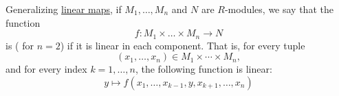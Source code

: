 \begin{definition}\label{def:multilinear_function}\mimprovised
  Generalizing \hyperref[def:semimodule/homomorphism]{linear maps}, if \( M_1, \ldots, M_n \) and \( N \) are \( R \)-modules, we say that the function
  \begin{equation*}
    f: M_1 \times \ldots \times M_n \to N
  \end{equation*}
  is  ( for \( n = 2 \)) if it is linear in each component. That is, for every tuple
  \begin{equation*}
    (x_1, \ldots, x_n) \in M_1 \times \cdots \times M_n,
  \end{equation*}
  and for every index \( k = 1, \ldots, n \), the following function is linear:
  \begin{equation*}
    y \mapsto f(x_1, \ldots, x_{k-1}, y, x_{k+1}, \ldots, x_n)
  \end{equation*}
\end{definition}

